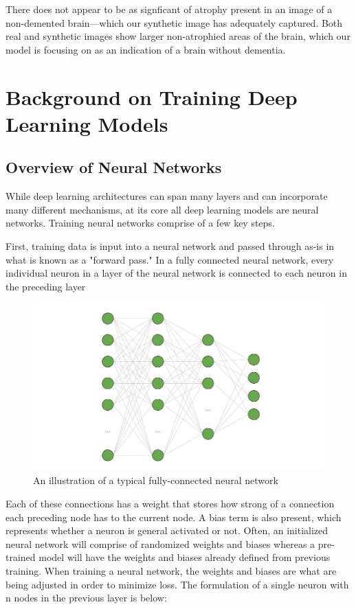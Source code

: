 \documentclass [MS] {uclathes}
\begin{document}
There does not appear to be as signficant of atrophy present in an image of a non-demented brain---which our synthetic 
image has adequately captured. Both real and synthetic images show larger non-atrophied areas of the brain, which our 
model is focusing on as an indication of a brain without dementia.

\chapter{Background on Training Deep Learning Models}

\section{Overview of Neural Networks}
While deep learning architectures can span many layers and can incorporate many different mechanisms, at its core all 
deep learning models are neural networks. Training neural networks comprise of a few key steps. 

First, training data is input into a neural network and passed through as-is in what is known as a "forward pass." In a 
fully connected neural network, every individual neuron in a layer of the neural network is connected to each neuron in 
the preceding layer 

\begin{figure}[H]
    \centering
    \includegraphics[width=0.75\linewidth]{figures/NN_diagram.jpg}
    \caption{An illustration of a  typical fully-connected neural network}
    \label{fig:enter-label}
\end{figure}

Each of these connections has a weight that stores how strong of a connection each preceding node has to the current 
node. A bias term is also present, which represents whether a neuron is general activated or not. Often, an initialized 
neural network will comprise of randomized weights and biases whereas a pre-trained model will have the weights and 
biases already defined from previous training. When training a neural network, the weights and biases are what are being 
adjusted in order to minimize loss. The formulation of a single neuron with n nodes in the previous layer is below:
\end{document}
